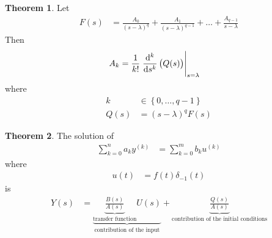 \documentclass[fleqn, a4paper, 12pt, twoside]{article}
\theoremstyle{definition}
\theoremstyle{theorem}
\newtheorem{theorem}{Theorem}
\begin{document}
\begin{theorem}
	Let
	\begin{align*}
		F(s) & = \frac{A_0}{(s - \lambda)^q} + \frac{A_1}{(s - \lambda)^{q - 1}} + \dots + \frac{A_{q - 1}}{s - \lambda}
	\end{align*}
	Then
	\begin{align*}
		A_k & = \frac{1}{k!} \left. \dod[k]{}{s}\left( Q(s) \right) \right|_{s = \lambda}
	\end{align*}
	where
	\begin{align*}
		k    & \in \left\{ 0 , \dots , q - 1 \right\} \\
		Q(s) & = (s - \lambda)^q F(s)
	\end{align*}
\end{theorem}

\begin{theorem}
	The solution of
	\begin{align*}
		\sum\limits_{k = 0}^{n} a_k y^{(k)} & = \sum\limits_{k = 0}^{m} b_k u^{(k)}
	\end{align*}
	where
	\begin{align*}
		u(t) & = f(t) \delta_{-1}(t)
	\end{align*}
	is
	\begin{align*}
		Y(s) & = \underbrace{\underbrace{\frac{B(s)}{A(s)}}_{\text{transfer function}} U(s)}_{\text{contribution of the input}} + \underbrace{\frac{Q(s)}{A(s)}}_{\text{contribution of the initial conditions}}
	\end{align*}
\end{theorem}
\end{document}
